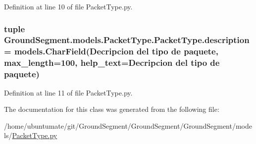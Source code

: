 Definition at line 10 of file Packet\+Type.\+py.

\hypertarget{class_ground_segment_1_1models_1_1_packet_type_1_1_packet_type_a0d613a065a218585e621622d3945e206}{}
\subsubsection[{description}]{\setlength{\rightskip}{0pt plus 5cm}tuple Ground\+Segment.\+models.\+Packet\+Type.\+Packet\+Type.\+description = models.\+Char\+Field(\textquotesingle{}Decripcion del tipo de paquete\textquotesingle{}, max\+\_\+length=100, help\+\_\+text=\textquotesingle{}Decripcion del tipo de paquete\textquotesingle{})\hspace{0.3cm}{\ttfamily [static]}}\label{class_ground_segment_1_1models_1_1_packet_type_1_1_packet_type_a0d613a065a218585e621622d3945e206}


Definition at line 11 of file Packet\+Type.\+py.



The documentation for this class was generated from the following file\+:\begin{DoxyCompactItemize}
\item 
/home/ubuntumate/git/\+Ground\+Segment/\+Ground\+Segment/\+Ground\+Segment/models/\hyperlink{_packet_type_8py}{Packet\+Type.\+py}\end{DoxyCompactItemize}

